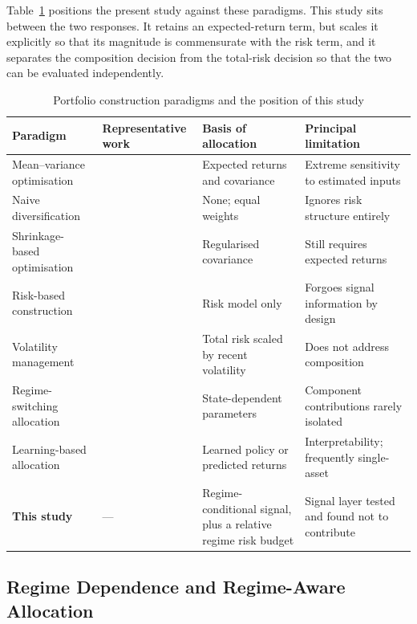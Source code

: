 \documentclass{singlecol-new}
\theoremstyle{TH}{
\newtheorem{lemma}{Lemma}
\newtheorem{theorem}[lemma]{Theorem}
\newtheorem{corrolary}[lemma]{Corrolary}
\newtheorem{conjecture}[lemma]{Conjecture}
\newtheorem{proposition}[lemma]{Proposition}
\newtheorem{claim}[lemma]{Claim}
\newtheorem{stheorem}[lemma]{Wrong Theorem}
\newtheorem{algorithm}{Algorithm}
}
\theoremstyle{THrm}{
\newtheorem{definition}{Definition}[section]
\newtheorem{question}{Question}[section]
\newtheorem{remark}{Remark}
\newtheorem{scheme}{Scheme}
}
\theoremstyle{THhit}{
\newtheorem{case}{Case}[section]
}
\begin{document}
Table~\ref{tab:paradigms} positions the present study against these paradigms.
This study sits between the two responses. It retains an expected-return term, but
scales it explicitly so that its magnitude is commensurate with the risk term, and it
separates the composition decision from the total-risk decision so that the two can be
evaluated independently.

\begin{table}[!ht]
\centering
\caption{Portfolio construction paradigms and the position of this study}
\label{tab:paradigms}
\small
\begin{tabular}{p{2.4cm}p{2.4cm}p{2.6cm}p{2.6cm}}
\hline
\textbf{Paradigm} & \textbf{Representative work} & \textbf{Basis of allocation} & \textbf{Principal limitation} \\
\hline
Mean--variance optimisation & \citet{markowitz52} & Expected returns and covariance & Extreme sensitivity to estimated inputs \\
\hline
Naive diversification & \citet{demiguel09} & None; equal weights & Ignores risk structure entirely \\
\hline
Shrinkage-based optimisation & \citet{ledoit04, lu25} & Regularised covariance & Still requires expected returns \\
\hline
Risk-based construction & \citet{prado16, asimit25} & Risk model only & Forgoes signal information by design \\
\hline
Volatility management & \citet{moreira17, hood25} & Total risk scaled by recent volatility & Does not address composition \\
\hline
Regime-switching allocation & \citet{angbekaert02, kritzman12, luo26} & State-dependent parameters & Component contributions rarely isolated \\
\hline
Learning-based allocation & \citet{jiang25, ashrafzadeh25, agal25} & Learned policy or predicted returns & Interpretability; frequently single-asset \\
\hline
\textbf{This study} & --- & Regime-conditional signal, plus a relative regime risk budget & Signal layer tested and found not to contribute \\
\hline
\end{tabular}
\end{table}

\subsection{Regime Dependence and Regime-Aware Allocation}
\end{document}

